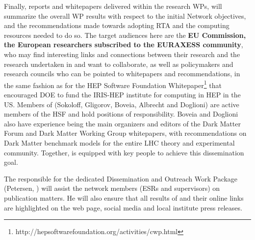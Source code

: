 Finally, reports and whitepapers delivered within the research WPs, will summarize the overall WP results with respect to the initial Network objectives, and the recommendations
made towards adopting RTA and the computing resources needed to do so. 
The target audiences here are the \textbf{EU Commission, the European researchers subscribed to the EURAXESS community}, who may find interesting links and connections between
their research and the research undertaken in \acronym and want to collaborate, as well as policymakers and research councils who can be pointed to whitepapers and recommendations, in the same fashion as for the HEP Software Foundation Whitepaper\footnote{http://hepsoftwarefoundation.org/activities/cwp.html} that encouraged DOE to fund the IRIS-HEP institute for computing in HEP in the US.  
Members of \acronym (Sokoloff, Gligorov, Boveia, Albrecht and Doglioni) are active members of the HSF and hold positions of responsibility.  
Boveia and Doglioni also have experience being the main organizers and editors of the Dark Matter Forum and Dark Matter Working Group whitepapers, with recommendations on Dark Matter benchmark models for the entire LHC theory and experimental community. 
Together, \acronym is equipped with  key people to achieve this dissemination goal. 

The responsible for the dedicated Dissemination and Outreach Work Package (Petersen, \cernentity) will assist the network members (ESRs and supervisors) on publication matters. 
He will also ensure that all results of \acronym and their online links are highlighted on the \acronym web page, social media and local institute press releases. 
